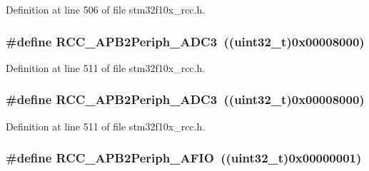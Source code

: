 Definition at line 506 of file stm32f10x\+\_\+rcc.\+h.

\subsubsection[{\texorpdfstring{R\+C\+C\+\_\+\+A\+P\+B2\+Periph\+\_\+\+A\+D\+C3}{RCC_APB2Periph_ADC3}}]{\setlength{\rightskip}{0pt plus 5cm}\#define R\+C\+C\+\_\+\+A\+P\+B2\+Periph\+\_\+\+A\+D\+C3~(({\bf uint32\+\_\+t})0x00008000)}\hypertarget{group___a_p_b2__peripheral_ga371d55bbf17bf965a213c59f2d276d72}{}\label{group___a_p_b2__peripheral_ga371d55bbf17bf965a213c59f2d276d72}


Definition at line 511 of file stm32f10x\+\_\+rcc.\+h.

\subsubsection[{\texorpdfstring{R\+C\+C\+\_\+\+A\+P\+B2\+Periph\+\_\+\+A\+D\+C3}{RCC_APB2Periph_ADC3}}]{\setlength{\rightskip}{0pt plus 5cm}\#define R\+C\+C\+\_\+\+A\+P\+B2\+Periph\+\_\+\+A\+D\+C3~(({\bf uint32\+\_\+t})0x00008000)}\hypertarget{group___a_p_b2__peripheral_ga371d55bbf17bf965a213c59f2d276d72}{}\label{group___a_p_b2__peripheral_ga371d55bbf17bf965a213c59f2d276d72}


Definition at line 511 of file stm32f10x\+\_\+rcc.\+h.

\subsubsection[{\texorpdfstring{R\+C\+C\+\_\+\+A\+P\+B2\+Periph\+\_\+\+A\+F\+IO}{RCC_APB2Periph_AFIO}}]{\setlength{\rightskip}{0pt plus 5cm}\#define R\+C\+C\+\_\+\+A\+P\+B2\+Periph\+\_\+\+A\+F\+IO~(({\bf uint32\+\_\+t})0x00000001)}\hypertarget{group___a_p_b2__peripheral_ga5aa9469879ffa019d4836b0d297104c5}{}\label{group___a_p_b2__peripheral_ga5aa9469879ffa019d4836b0d297104c5}


